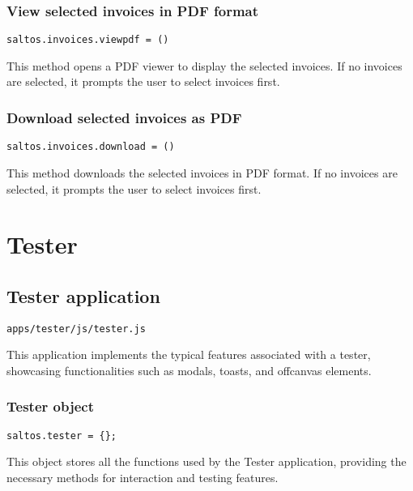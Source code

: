 \documentclass[a4paper]{article}
\begin{document}
\hypertarget{toc154}{}
\subsubsection{View selected invoices in PDF format}

\begin{lstlisting}
saltos.invoices.viewpdf = ()
\end{lstlisting}

This method opens a PDF viewer to display the selected invoices.
If no invoices are selected, it prompts the user to select invoices first.

\hypertarget{toc155}{}
\subsubsection{Download selected invoices as PDF}

\begin{lstlisting}
saltos.invoices.download = ()
\end{lstlisting}

This method downloads the selected invoices in PDF format.
If no invoices are selected, it prompts the user to select invoices first.


\hypertarget{toc156}{}
\section{Tester}

\hypertarget{toc157}{}
\subsection{Tester application}

\begin{lstlisting}
apps/tester/js/tester.js
\end{lstlisting}

This application implements the typical features associated with a tester,
showcasing functionalities such as modals, toasts, and offcanvas elements.

\hypertarget{toc158}{}
\subsubsection{Tester object}

\begin{lstlisting}
saltos.tester = {};
\end{lstlisting}

This object stores all the functions used by the Tester application,
providing the necessary methods for interaction and testing features.
\end{document}
